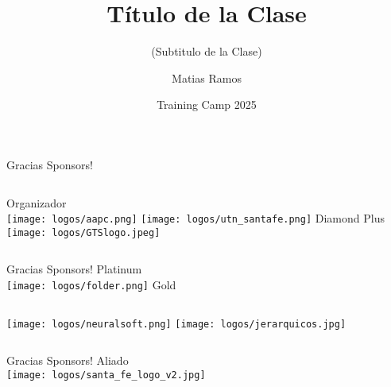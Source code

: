 \documentclass{beamer}
\title %
{Título de la Clase}
\subtitle{(Subtitulo de la Clase)}
\author[Matias Ramos]{Matias Ramos}
\institute[]{Universidad Tecnológica Nacional - Facultad Regional Santa Fe}
\date[TC 2025]{Training Camp 2025}
\begin{document}
\frame{\titlepage}





\begin{frame}{Gracias Sponsors!}
    \begin{columns}[t]
        \centering
        Organizador\\
        \vspace{0.5cm}
        \texttt{[image: logos/aapc.png]}
        \texttt{[image: logos/utn\_santafe.png]}
        \centering
        Diamond Plus\\
        \texttt{[image: logos/GTSlogo.jpeg]}
    \end{columns}
\end{frame}


\begin{frame}{Gracias Sponsors!}
    \centering
    Platinum \\
    \texttt{[image: logos/folder.png]}
    \vfill
    \centering
    Gold \\
    \vfill
    \begin{columns}[b]
        \centering
        \texttt{[image: logos/neuralsoft.png]}
        \centering
        \texttt{[image: logos/jerarquicos.jpg]}
    \end{columns}
\end{frame}


\begin{frame}{Gracias Sponsors!}
    \centering
    Aliado \\
    \vspace{1cm}
    \texttt{[image: logos/santa\_fe\_logo\_v2.jpg]}
\end{frame}
\end{document}
